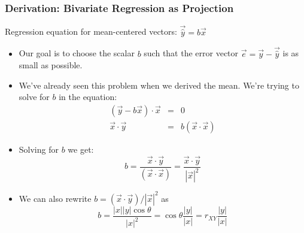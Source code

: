 \documentclass{beamer}
\begin{document}
\begin{frame}[allowframebreaks]
  \frametitle{Derivation: Bivariate Regression as Projection}

Regression equation for mean-centered vectors: $\vec{\widehat{y}} = b\vec{x}$

\begin{itemize}
\item Our goal is to choose the scalar $b$ such that the error vector $\vec{e} = \vec{y} - \vec{\widehat{y}}$ is as small as possible.

\item We've already seen this problem when we derived the mean. We're trying to solve for $b$ in the equation:
%
\begin{eqnarray*}
(\vec{y} - b\vec{x}) \cdot \vec{x} &=& 0 \\
\vec{x} \cdot \vec{y} &=& b(\vec{x} \cdot \vec{x})
\end{eqnarray*}

\item Solving for $b$ we get:
%
\[
b = \frac{\vec{x} \cdot \vec{y}}{(\vec{x} \cdot \vec{x})} = \frac{\vec{x} \cdot \vec{y}}{|\vec{x}|^2}
\]

\item We can also rewrite $b = (\vec{x} \cdot \vec{y})/|\vec{x}|^2$ as
%
\[
b = \frac{|x||y| \cos \theta}{|x|^2}
  = \cos \theta \frac{|y|}{|x|}
  = r_{XY} \frac{|y|}{|x|}
\]

\end{itemize}


\end{frame}
\end{document}
